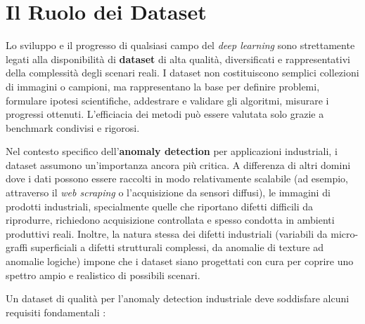 \section{Il Ruolo dei Dataset}
\label{sec:dataset}

Lo sviluppo e il progresso di qualsiasi campo del \textit{deep learning} sono strettamente legati alla disponibilità di \textbf{dataset} di alta qualità, diversificati e rappresentativi della complessità degli scenari reali. I dataset non costituiscono semplici collezioni di immagini o campioni, ma rappresentano la base per definire pro\-ble\-mi, formulare ipotesi scientifiche, addestrare e validare gli algoritmi, misurare i progressi ottenuti. L'efficiacia dei metodi può essere valutata solo grazie a benchmark condivisi e rigorosi. 

Nel contesto specifico dell'\textbf{anomaly detection} per applicazioni industriali, i dataset assumono un'importanza ancora più critica. A differenza di altri domini dove i dati possono essere raccolti in modo relativamente scalabile (ad esempio, attraverso il \textit{web scraping} o l'acquisizione da sensori diffusi), le immagini di prodotti industriali, specialmente quelle che riportano difetti difficili da riprodurre, richiedono acquisizione controllata e spesso condotta in am\-bien\-ti produttivi reali. Inoltre, la natura stessa dei difetti industriali (variabili da micro-graffi superficiali a difetti strutturali complessi, da anomalie di texture ad anomalie logiche) impone che i dataset siano progettati con cura per coprire uno spettro ampio e realistico di possibili scenari.

Un dataset di qualità per l'anomaly detection industriale deve soddisfare alcuni requisiti fondamentali \cite{bergmann2019mvtec, bergmann2022beyond}:

